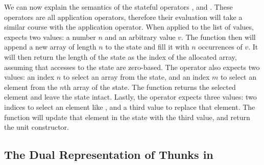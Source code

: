 We can now explain the semantics of the stateful operators ,
 and . These operators are all application operators,
therefore their evaluation will take a similar course with the application
operator. When applied to the list of values,  expects two values: a
number $n$ and an arbitrary value $v$. The  function then will
append a new array of length $n$ to the state and fill it with $n$ occurrences
of $v$. It will then return the length of the state as the index of the
allocated array, assuming that accesses to the state are zero-based. The
 operator also expects two values: an index $n$ to select an array from
the state, and an index $m$ to select an element from the $n$th array of the
state. The  function returns the selected element and leave the
state intact. Lastly, the  operator expects three values: two
indices to select an element like , and a third value to replace that
element. The  function will update that element in the state
with the third value, and return the unit constructor.

\subsection{The Dual Representation of Thunks in \StateLang{}}

